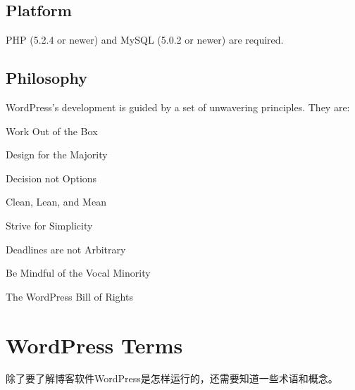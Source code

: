 \subsection{Platform}

PHP (5.2.4 or newer) and MySQL (5.0.2 or newer) are required. 

\subsection{Philosophy}

WordPress's development is guided by a set of unwavering principles. They are:
\begin{compactitem}
\item Work Out of the Box
\item Design for the Majority
\item Decision not Options
\item Clean, Lean, and Mean
\item Strive for Simplicity
\item Deadlines are not Arbitrary
\item Be Mindful of the Vocal Minority
\item The WordPress Bill of Rights
\end{compactitem}


\section{WordPress Terms}

除了要了解博客软件WordPress是怎样运行的，还需要知道一些术语和概念。

